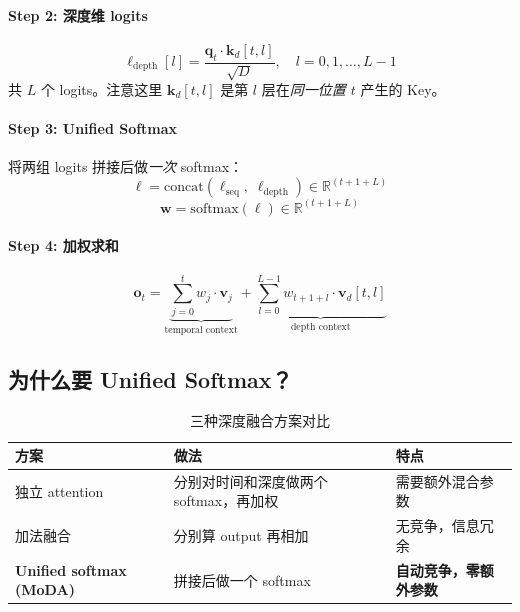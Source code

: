 \documentclass[11pt,a4paper]{article}
\begin{document}
\paragraph{Step 2: 深度维 logits}
\begin{equation}
  \ell_{\text{depth}}[l] = \frac{\mathbf{q}_t \cdot \mathbf{k}_{d}[t, l]}{\sqrt{D}}, \quad l = 0, 1, \ldots, L-1
  \label{eq:logits_depth}
\end{equation}
共 $L$ 个 logits。注意这里 $\mathbf{k}_{d}[t, l]$ 是第 $l$ 层在\emph{同一位置 $t$} 产生的 Key。

\paragraph{Step 3: Unified Softmax}
将两组 logits 拼接后做\emph{一次} softmax：
\begin{equation}
  \boldsymbol{\ell} = \text{concat}(\ell_{\text{seq}},\; \ell_{\text{depth}}) \in \mathbb{R}^{(t+1+L)}
\end{equation}
\begin{equation}
  \mathbf{w} = \text{softmax}(\boldsymbol{\ell}) \in \mathbb{R}^{(t+1+L)}
  \label{eq:unified_softmax}
\end{equation}

\paragraph{Step 4: 加权求和}
\begin{equation}
  \mathbf{o}_t = \underbrace{\sum_{j=0}^{t} w_j \cdot \mathbf{v}_j}_{\text{temporal context}} + \underbrace{\sum_{l=0}^{L-1} w_{t+1+l} \cdot \mathbf{v}_{d}[t, l]}_{\text{depth context}}
  \label{eq:output}
\end{equation}

\subsection{为什么要 Unified Softmax？}

\begin{table}[h]
\centering
\begin{tabular}{lll}
\toprule
方案 & 做法 & 特点 \\
\midrule
独立 attention & 分别对时间和深度做两个 softmax，再加权 & 需要额外混合参数 \\
加法融合 & 分别算 output 再相加 & 无竞争，信息冗余 \\
\textbf{Unified softmax (MoDA)} & 拼接后做一个 softmax & \textbf{自动竞争，零额外参数} \\
\bottomrule
\end{tabular}
\caption{三种深度融合方案对比}
\end{table}
\end{document}
